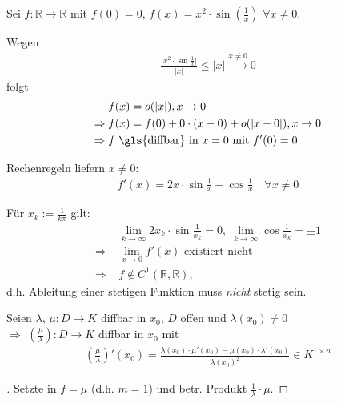 \begin{example}
	Sei $f:\mathbb{R}\to \mathbb{R}$ mit $f(0) = 0$, $f(x)=x^2\cdot \sin\left(\frac{1}{x}\right)$ $\forall x\neq 0$.
	
	Wegen \begin{align*}
		\frac{\vert x^2 \cdot \sin \frac{1}{x}\vert}{\vert x \vert} \le \vert x \vert \xrightarrow{x\neq 0} 0
	\end{align*}
	folgt{ \zeroAmsmathAlignVSpaces \begin{align*}
		& f(x) = o(\vert x \vert), x\to 0 \\
		\Rightarrow\;& f(x) = f(0) + 0\cdot (x - 0) + o(\vert x - 0\vert), x\to 0 \\
		\Rightarrow\;& f \text{  \gls{diffbar} in $x=0$ mit $f'(0) = 0$}
	\end{align*}}
	
	Rechenregeln liefern $x\neq 0$: \begin{align*}
		f'(x) = 2x\cdot\sin\frac{1}{x}- \cos\frac{1}{x} \quad\forall x\neq 0
	\end{align*}
	
	Für $x_k := \frac{1}{k\pi}$ gilt: \begin{align*}
		& \lim\limits_{k\to\infty} 2 x_k \cdot \sin \frac{1}{x_k} = 0,\; \lim\limits_{k\to\infty} \cos \frac{1}{x_k} = \pm 1 \\
		\Rightarrow\;& \lim\limits_{x\to 0} f'(x) \text{ existiert nicht} \\
		\Rightarrow\;& f\notin C^1(\mathbb{R}, \mathbb{R}),
	\end{align*}
	d.h. Ableitung einer stetigen Funktion muss \emph{nicht} stetig sein.
\end{example}

\begin{conclusion}
	Seien $\lambda$, $\mu:D\to K$  \gls{diffbar} in $x_0$, $D$ offen und $\lambda(x_0)\neq 0$ \\
	$\Rightarrow$ $\left( \frac{\mu}{\lambda} \right): D\to K$  \gls{diffbar} in $x_0$ mit \begin{align*}
		\left( \frac{\mu}{\lambda} \right)' (x_0) = \frac{\lambda(x_0)\cdot \mu'(x_0) - \mu(x_0) \cdot \lambda'(x_0)}{\lambda(x_0)^2}\in K^{1\times n}
	\end{align*}
\end{conclusion}

\begin{proof}[]
	Setzte in  $f=\mu$ (d.h. $m=1$) und betr. Produkt $\frac{1}{\lambda}\cdot \mu$.
\end{proof}


